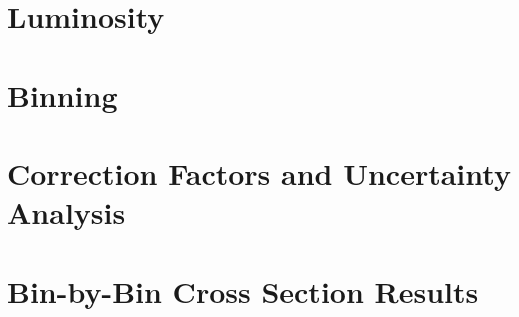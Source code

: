 \section{Luminosity}\label{sec:luminosity}
    
    \clearpage
\section{Binning}\label{sec:Ch4_binning}
    
    \clearpage
\section{Correction Factors and Uncertainty Analysis}\label{sec:Ch4_corr_factors}
    
    \clearpage

\section{Bin-by-Bin Cross Section Results}\label{sec:Ch4_cross_section}
    
    \clearpage
    

\iffalse

For each kinematic bin the differential cross section can be written as:

\begin{equation}
    \sigma = \frac{N_{meas}}{L \epsilon}\frac{1}{\delta}
\end{equation}

Where $\frac{N_{meas}}{L}$ is the number of events from experiment normalized by the integrated luminosity before acceptance and radiatvie corrections. $\epsilon$ = $\frac{N^{RAD}_{rec}}{{N^{RAD}_{gen}}}$ is the acceptance correction and $\delta$ is the radiative correction.



$\delta$ can be obtained by using the following:

\begin{equation}
    \delta = \frac{N^{RAD}_{gen}}{N^{NORAD}_{gen}}
\end{equation}

$\delta$ and $\epsilon$ need to be properly calculated, but for a first pass we will ignore them so we have just
\fi



